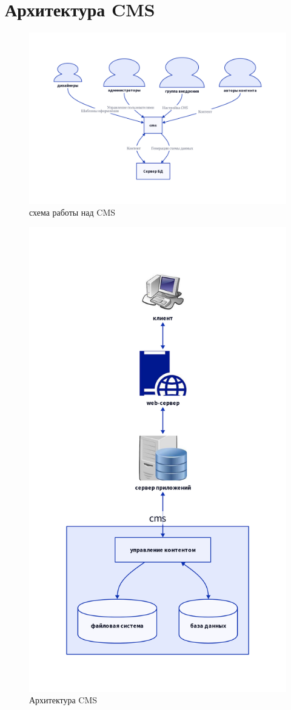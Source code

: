 \documentclass[11pt]{article}
\begin{document}
\section{Архитектура CMS}
\label{sec:org55160fc}
\begin{figure}[htbp]
\centering
\includegraphics[width=.9\linewidth]{./pic.png}
\caption{схема работы над CMS}
\end{figure}
\begin{figure}[htbp]
\centering
\includegraphics[width=.9\linewidth]{./architecture.png}
\caption{Архитектура CMS}
\end{figure}
\end{document}
